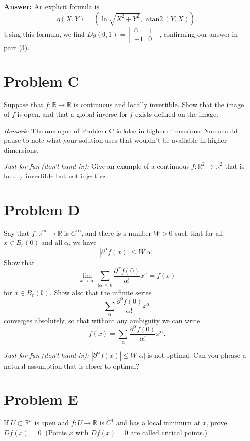 \documentclass[lang=en,11pt]{template}
\begin{document}
\textbf{Answer:} An explicit formula is
\[
g(X, Y) = \left( \ln \sqrt{X^2 + Y^2}, \, \operatorname{atan2}(Y, X) \right).
\]
Using this formula, we find \( Dg(0, 1) = \begin{bmatrix} 0 & 1 \\ -1 & 0 \end{bmatrix} \), confirming our answer in part (3).


\section*{Problem C}
Suppose that $f : \mathbb{R} \to \mathbb{R}$ is continuous and locally invertible. Show that the image of $f$ is open, and that a global inverse for $f$ exists defined on the image.

\textit{Remark:} The analogue of Problem C is false in higher dimensions. You should pause to note what your solution uses that wouldn’t be available in higher dimensions.

\textit{Just for fun (don’t hand in):} Give an example of a continuous $f : \mathbb{R}^2 \to \mathbb{R}^2$ that is locally invertible but not injective.

\section*{Problem D}
Say that $f : \mathbb{R}^m \to \mathbb{R}$ is $C^\infty$, and there is a number $W > 0$ such that for all $x \in B_r(0)$ and all $\alpha$, we have
\[
|\partial^\alpha f(x)| \leq W |\alpha|.
\]
Show that
\[
\lim_{k \to \infty} \sum_{|\alpha| \leq k} \frac{\partial^\alpha f(0)}{\alpha!} x^\alpha = f(x)
\]
for $x \in B_r(0)$. Show also that the infinite series
\[
\sum_{\alpha} \frac{\partial^\alpha f(0)}{\alpha!} x^\alpha
\]
converges absolutely, so that without any ambiguity we can write
\[
f(x) = \sum_{\alpha} \frac{\partial^\alpha f(0)}{\alpha!} x^\alpha.
\]

\textit{Just for fun (don’t hand in):} $|\partial^\alpha f(x)| \leq W |\alpha|$ is not optimal. Can you phrase a natural assumption that is closer to optimal?

\section*{Problem E}
If $U \subset \mathbb{R}^n$ is open and $f : U \to \mathbb{R}$ is $C^1$ and has a local minimum at $x$, prove $Df(x) = 0$. (Points $x$ with $Df(x) = 0$ are called critical points.)
\end{document}
